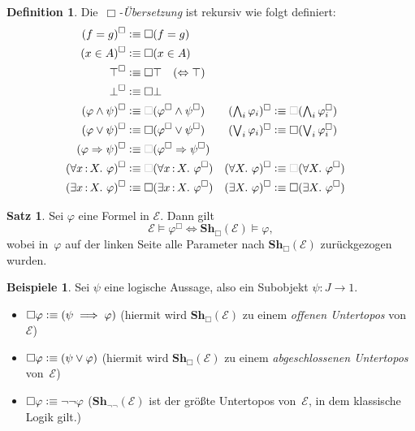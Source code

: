 \documentclass{article}
\theoremstyle{definition}
\newtheorem*{defn}{Definition}
\newtheorem*{satz}{Satz}
\newtheorem*{bspe}{Beispiele}
\theoremstyle{remark}
\newcommand{\defequiv}{\vcentcolon\equiv}
\newcommand{\?}{\,{:}\,}
\renewcommand{\_}{\mathpunct{.}\,}
\newcommand{\Sh}{\mathbf{Sh}} %
\newcommand{\Eat}{\mathcal{E}} %
\begin{document}

\begin{defn}
Die~\emph{$\Box$-Übersetzung} ist rekursiv wie folgt definiert:
\newcommand{\optBox}{\textcolor{lightgray}{\Box}}
\begin{align*}
  (f = g)^\Box &\defequiv \Box(f = g) \\
  (x \in A)^\Box &\defequiv \Box(x \in A) \\
  \top^\Box &\defequiv \Box\top \quad \text{($\Leftrightarrow \top$)} \\
  \bot^\Box &\defequiv \Box\bot \\
  (\varphi \wedge \psi)^\Box &\defequiv \optBox(\varphi^\Box \wedge \psi^\Box) &
  \textstyle (\bigwedge_i \varphi_i)^\Box &\defequiv \textstyle \optBox(\bigwedge_i \varphi_i^\Box) \\
  (\varphi \vee \psi)^\Box &\defequiv \Box(\varphi^\Box \vee \psi^\Box) &
  \textstyle (\bigvee_i \varphi_i)^\Box &\defequiv \textstyle \Box(\bigvee_i \varphi_i^\Box) \\
  (\varphi \Rightarrow \psi)^\Box &\defequiv \optBox(\varphi^\Box \Rightarrow \psi^\Box) \\
  (\forall x\?X\_ \varphi)^\Box &\defequiv \optBox(\forall x\?X\_ \varphi^\Box) &
  (\forall X\_ \varphi)^\Box &\defequiv \optBox(\forall X\_ \varphi^\Box) \\
  (\exists x\?X\_ \varphi)^\Box &\defequiv \Box(\exists x\?X\_ \varphi^\Box) &
  (\exists X\_ \varphi)^\Box &\defequiv \Box(\exists X\_ \varphi^\Box)
\end{align*}
\end{defn}

\begin{satz}
  Sei $\varphi$ eine Formel in $\Eat$.
  Dann gilt
  \[
    \Eat \models \varphi^\Box \iff
    \Sh_\Box(\Eat) \models \varphi,
  \]
  wobei in~$\varphi$ auf der linken Seite alle Parameter nach $\Sh_\Box(\Eat)$ zurückgezogen wurden.
\end{satz}

\begin{bspe}
  Sei $\psi$ eine logische Aussage, also ein Subobjekt $\psi : J \to 1$.
  \begin{itemize}
    \item
      $\Box \varphi \defequiv (\psi \implies \varphi)$ \quad
      (hiermit wird $\Sh_\Box(\Eat)$ zu einem \emph{offenen Untertopos} von~$\Eat$)
    \item
      $\Box \varphi \defequiv (\psi \vee \varphi)$ \quad
      (hiermit wird $\Sh_\Box(\Eat)$ zu einem \emph{abgeschlossenen Untertopos} von~$\Eat$)
    \item
      $\Box \varphi \defequiv \neg \neg \varphi$ \quad
      ($\Sh_{\neg \neg}(\Eat)$ ist der größte Untertopos von~$\Eat$, in dem klassische Logik gilt.)
  \end{itemize}
\end{bspe}
\end{document}
